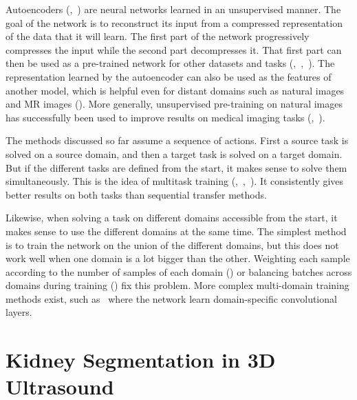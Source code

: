 Autoencoders (\textcite{ballard1987},~\textcite{bengio2007NIPS}) are neural networks learned in an unsupervised manner. The goal of the network is to reconstruct its input from a compressed representation of the data that it will learn. The first part of the network progressively compresses the input while the second part decompresses it. That first part can then be used as a pre-trained network for other datasets and tasks (\textcite{bengio2007NIPS},~\textcite{vincent2008ICML},~\textcite{erhan2010JMLR}). The representation learned by the autoencoder can also be used as the features of another model, which is helpful even for distant domains such as natural images and MR images (\textcite{gupta2013ICML}). More generally, unsupervised pre-training on natural images has successfully been used to improve results on medical imaging tasks (\textcite{schlegl2014MICCAI},~\textcite{hofmanninger2015CVPR}).

The methods discussed so far assume a sequence of actions. First a source task is solved on a source domain, and then a target task is solved on a target domain. But if the different tasks are defined from the start, it makes sense to solve them simultaneously. This is the idea of multitask training (\textcite{caruana1995NIPS},~\textcite{caruana1997},~\textcite{collobert2008ICML}). It consistently gives better results on both tasks than sequential transfer methods. 

Likewise, when solving a task on different domains accessible from the start, it makes sense to use the different domains at the same time. The simplest method is to train the network on the union of the different domains, but this does not work well when one domain is a lot bigger than the other. Weighting each sample according to the number of samples of each domain (\textcite{daume2007}) or balancing batches across domains during training (\textcite{buda2017}) fix this problem. More complex multi-domain training methods exist, such as~\textcite{nam2016CVPR} where the network learn domain-specific convolutional layers.





\section{Kidney Segmentation in 3D Ultrasound}
\label{sec:kidney}


